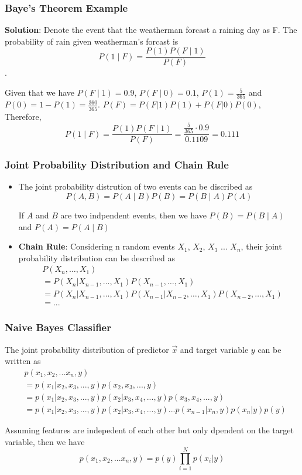 \documentclass[notheorems, aspectratio=54]{beamer}
\begin{document}
\begin{frame}
\frametitle{Baye's Theorem Example}
\textbf{Solution}: Denote the event that the weatherman forcast a raining day as F. The probability of rain given weatherman's forcast is $$P(1 \mid F)=\frac{P(1)P(F\mid 1)}{P(F)}$$. 

Given that we have $P(F \mid 1)=0.9$, $P(F\mid 0)=0.1$, $P(1)=\frac{5}{365}$ and $P(0)=1-P(1)= \frac{360}{365}$. $P(F)=P(F|1)P(1)+P(F|0)P(0)$,
Therefore, 
$$P(1 \mid F)=\frac{P(1)P(F\mid 1)}{P(F)}=\frac{\frac{5}{365}\cdot0.9}{0.1109}=0.111$$
\end{frame}

\begin{frame}

\frametitle{Joint Probability Distribution and Chain Rule}

\begin{itemize}
\item The joint probability distrution of two events can be discribed as $$P(A, B)=P(A\mid B)P(B)=P(B \mid A)P(A)$$

If $A$ and $B$ are two indpendent events, then we have $P(B)=P(B\mid A)$ and $P(A)=P(A\mid B)$

\vspace{0.5cm}

\item \textbf{Chain Rule}: Considering n random events $X_1$, $X_2$, $X_3$ ... $X_n$, their joint probability distribution can be described as
\begin{align*}
&P(X_n, \ldots, X_1)\\
&=P(X_{n}|X_{n-1},\ldots ,X_{1})P(X_{n-1},\ldots ,X_{1})\\
&=P(X_{n}|X_{n-1},\ldots ,X_{1})P(X_{n-1}|X_{n-2},\ldots ,X_{1})P(X_{n-2},\ldots ,X_{1})\\
&=...
\end{align*}
\end{itemize}
\end{frame}



\begin{frame}
\frametitle{Naive Bayes Classifier}
The joint probability distribution of predictor $\vec{x}$ and target variable $y$ can be written as
\begin{align*}
&p(x_1, x_2, ...x_n, y)\\
&=p(x_1|x_2, x_3, ..., y)p(x_2, x_3, ..., y)\\
&=p(x_1|x_2, x_3, ..., y)p(x_2|x_3, x_4, ..., y)p(x_3, x_4, ..., y)\\
&=p(x_1|x_2, x_3, ..., y)p(x_2|x_3, x_4, ..., y)...p(x_{n-1}|x_n, y)p(x_n|y)p(y)
\end{align*}


Assuming features are indepedent of each other but only dpendent on the target variable, then we have
$$
p(x_1, x_2, ...x_n, y)=p(y)\prod\limits_{i=1}^{N}p(x_i|y)
$$
\end{frame}
\end{document}
